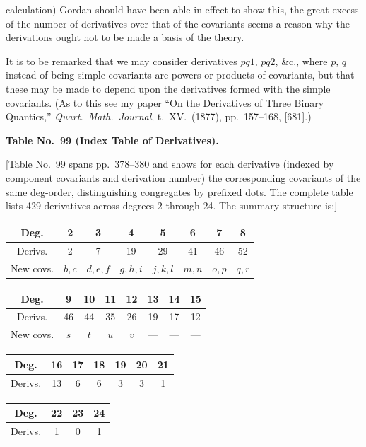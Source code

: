 \documentclass[12pt,a4paper]{article}
\begin{document}
calculation) Gordan should have been able in effect to show this, the great excess of the number of derivatives over that of the covariants seems a reason why the derivations ought not to be made a basis of the theory.

It is to be remarked that we may consider derivatives $p q 1$, $p q 2$, \&c., where $p$, $q$ instead of being simple covariants are powers or products of covariants, but that these may be made to depend upon the derivatives formed with the simple covariants. (As to this see my paper ``On the Derivatives of Three Binary Quantics,'' \textit{Quart.\ Math.\ Journal}, t.~XV.\ (1877), pp.~157--168, [681].)

\bigskip

\noindent\textbf{Table No.~99 (Index Table of Derivatives).}

\medskip

[Table No.~99 spans pp.\ 378--380 and shows for each derivative (indexed by component covariants and derivation number) the corresponding covariants of the same deg-order, distinguishing congregates by prefixed dots. The complete table lists 429 derivatives across degrees 2 through 24. The summary structure is:]

\begin{center}
\begin{tabular}{c|ccccccc}
Deg. & 2 & 3 & 4 & 5 & 6 & 7 & 8 \\[2pt]
\hline
Derivs. & 2 & 7 & 19 & 29 & 41 & 46 & 52 \\
\hline
New covs. & $b, c$ & $d, e, f$ & $g, h, i$ & $j, k, l$ & $m, n$ & $o, p$ & $q, r$ \\
\end{tabular}
\end{center}
\begin{center}
\begin{tabular}{c|ccccccc}
Deg. & 9 & 10 & 11 & 12 & 13 & 14 & 15 \\[2pt]
\hline
Derivs. & 46 & 44 & 35 & 26 & 19 & 17 & 12 \\
\hline
New covs. & $s$ & $t$ & $u$ & $v$ & --- & --- & --- \\
\end{tabular}
\end{center}
\begin{center}
\begin{tabular}{c|cccccc}
Deg. & 16 & 17 & 18 & 19 & 20 & 21 \\[2pt]
\hline
Derivs. & 13 & 6 & 6 & 3 & 3 & 1 \\
\end{tabular}
\end{center}
\begin{center}
\begin{tabular}{c|ccc}
Deg. & 22 & 23 & 24 \\[2pt]
\hline
Derivs. & 1 & 0 & 1 \\
\end{tabular}
\end{center}
\end{document}
